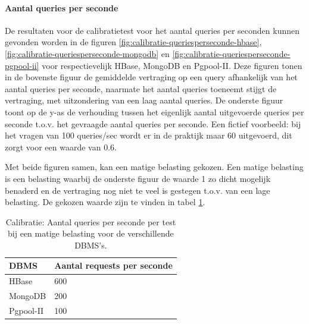 \paragraph{Aantal queries per seconde}
De resultaten voor de calibratietest voor het aantal queries per seconden kunnen gevonden worden in de figuren \ref{fig:calibratie-queriesperseconde-hbase}, \ref{fig:calibratie-queriesperseconde-mongodb} en \ref{fig:calibratie-queriesperseconde-pgpool-ii} voor respectievelijk HBase, MongoDB en Pgpool-II. Deze figuren tonen in de bovenste figuur de gemiddelde vertraging op een query afhankelijk van het aantal queries per seconde, naarmate het aantal queries toeneemt stijgt de vertraging, met uitzondering van een laag aantal queries. De onderste figuur toont op de y-as de verhouding tussen het eigenlijk aantal uitgevoerde queries per seconde t.o.v. het gevraagde aantal queries per seconde. Een fictief voorbeeld: bij het vragen van 100 queries/sec wordt er in de praktijk maar 60 uitgevoerd, dit zorgt voor een waarde van $0.6$. 

Met beide figuren samen, kan een matige belasting gekozen. Een matige belasting is een belasting waarbij de onderste figuur de waarde 1 zo dicht mogelijk benaderd en de vertraging nog niet te veel is gestegen t.o.v. van een lage belasting. De gekozen waarde zijn te vinden in tabel \ref{table:calibratie-queriesperseconde-resultaat}. 

\begin{table}[htb!]
	\centering
	\begin{tabular}{l| l }
		\textbf{DBMS} & Aantal requests per seconde \\
		\hline
		HBase & 600 \\
		MongoDB & 200\\
		Pgpool-II & 100\\
	\end{tabular}
	\caption{Calibratie: Aantal queries per seconde per test bij een matige belasting voor de verschillende DBMS's.}
	\label{table:calibratie-queriesperseconde-resultaat}
\end{table}

